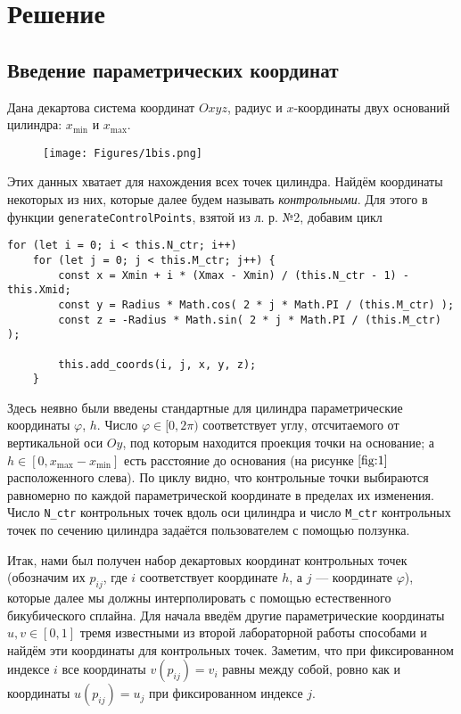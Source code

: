 \documentclass[12pt]{article}
\begin{document}
\section*{Решение}
\subsection*{Введение параметрических координат}
Дана декартова система координат $ Oxyz $, радиус и $ x $-координаты двух
оснований цилиндра: $ x_{\min} $ и $ x_{\max} $.

\begin{figure}[H]
  \centering
  \texttt{[image: Figures/1bis.png]}
  \caption{}
  \label{fig:1}
\end{figure}
Этих данных хватает для нахождения всех точек цилиндра. Найдём координаты
некоторых из них, которые далее будем называть \emph{контрольными}. Для этого в функции \texttt{generateControlPoints}, взятой из
л. р. №2, добавим цикл
\begin{lstlisting}[caption=Создание контрольных точек по входным параметрам.]
for (let i = 0; i < this.N_ctr; i++)
    for (let j = 0; j < this.M_ctr; j++) {
        const x = Xmin + i * (Xmax - Xmin) / (this.N_ctr - 1) - this.Xmid;
        const y = Radius * Math.cos( 2 * j * Math.PI / (this.M_ctr) );
        const z = -Radius * Math.sin( 2 * j * Math.PI / (this.M_ctr) );

        this.add_coords(i, j, x, y, z);
    }
\end{lstlisting}

Здесь неявно были введены стандартные для цилиндра параметрические координаты $
\varphi$, $ h $. Число
$ \varphi \in [0, 2\pi)$ соответствует углу, отсчитаемого от вертикальной оси $ Oy $, под которым находится
проекция точки на основание; а $ h \in [0, x_{\max} - x_{\min}]$ есть
расстояние до основания (на рисунке $ \ref{fig:1} $ расположенного слева). По циклу видно, что контрольные точки выбираются равномерно по каждой
параметрической координате в пределах их изменения. Число \verb|N_ctr| контрольных точек вдоль оси
цилиндра и число \verb|M_ctr| контрольных точек по сечению цилиндра задаётся
пользователем с помощью ползунка.

Итак, нами был получен набор декартовых координат контрольных точек (обозначим
их $ p_{ij} $, где $ i $ соответствует координате $ h $, а $ j $ --- координате
$ \varphi $), которые
далее мы должны интерполировать с помощью естественного бикубического сплайна.
Для начала введём другие параметрические координаты $ u ,  v \in [0, 1] $ тремя
известными из второй лабораторной работы способами и найдём эти координаты для
контрольных точек. Заметим, что при фиксированном индексе $ i $ все координаты
$ v(p_{ij}) = v_i $ равны между собой, ровно как и координаты $ u(p_{ij}) = u_j $ при
фиксированном индексе $ j $.
\end{document}
